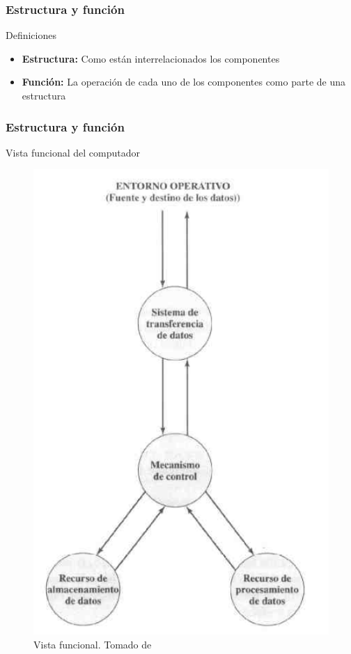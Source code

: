 \documentclass{beamer}
\begin{document}
	\begin{frame}
 		\frametitle{Estructura y función}
		\begin{block}{Definiciones}
		\begin{itemize}
			\item \textbf{Estructura:} Como están interrelacionados los componentes
			\item \textbf{Función:} La operación de cada uno de los componentes como parte de una estructura
		\end{itemize}
		\end{block}
	\end{frame}

	\begin{frame}
 		\frametitle{Estructura y función}
		\begin{block}{Vista funcional del computador}
\begin{figure}[H]
\centering
\includegraphics[scale=0.3]{imagenes/pc3.png}
\caption{Vista funcional. Tomado de \cite{stallings}}
\end{figure}
		\end{block}
	\end{frame}
\end{document}
